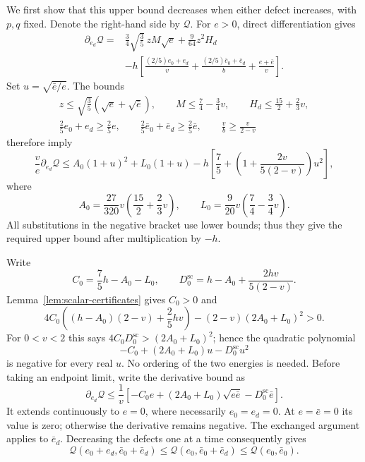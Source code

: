 We first show that this upper bound decreases when either defect
increases, with $p,q$ fixed. Denote the right-hand side by $\mathcal Q$.
For $e>0$, direct differentiation gives
\[
\begin{aligned}
 \partial_{e_d}\mathcal Q={}&
       \frac34\sqrt{\frac35}\,zM\sqrt e
       +\frac9{64}z^2H_d\\
 &-h\left[
       \frac{(2/5)e_0+e_d}{v}
       +\frac{(2/5)\bar e_0+\bar e_d}{b}
       +\frac{e+\bar e}{v}\right].
\end{aligned}
\]
Set $u=\sqrt{\bar e/e}$. The bounds
\[
\begin{gathered}
 z\le\sqrt{\frac35}(\sqrt e+\sqrt{\bar e}),\qquad
 M\le\frac74-\frac34v,\qquad H_d\le\frac{15}{2}+\frac23v,\\
 \frac25e_0+e_d\ge\frac25e,\qquad
 \frac25\bar e_0+\bar e_d\ge\frac25\bar e,
 \qquad \frac vb\ge\frac{v}{2-v}
\end{gathered}
\]
therefore imply
\[
 \frac ve\partial_{e_d}\mathcal Q
 \le A_0(1+u)^2+L_0(1+u)
       -h\left[\frac75+
          \left(1+\frac{2v}{5(2-v)}\right)u^2\right],
\]
where
\[
 A_0=\frac{27}{320}v\left(\frac{15}{2}+\frac23v\right),
 \qquad L_0=\frac9{20}v\left(\frac74-\frac34v\right).
\]
All substitutions in the negative bracket use lower bounds; thus they
give the required upper bound after multiplication by $-h$.

Write
\[
 C_0=\frac75h-A_0-L_0,\qquad
 D_0^{\mathrm{sc}}=h-A_0+\frac{2hv}{5(2-v)}.
\]
Lemma~\ref{lem:scalar-certificates} gives $C_0>0$ and
\[
 4C_0\left((h-A_0)(2-v)+\frac25hv\right)
       -(2-v)(2A_0+L_0)^2>0.
\]
For $0<v<2$ this says
$4C_0D_0^{\mathrm{sc}}>(2A_0+L_0)^2$; hence the quadratic polynomial
\[
 -C_0+(2A_0+L_0)u-D_0^{\mathrm{sc}}u^2
\]
is negative for every real $u$. No ordering of the two energies is
needed. Before taking an endpoint limit, write the derivative bound as
\[
 \partial_{e_d}\mathcal Q\le\frac1v
 \left[-C_0e+(2A_0+L_0)\sqrt{e\bar e}
                    -D_0^{\mathrm{sc}}\bar e\right].
\]
It extends continuously to $e=0$, where necessarily $e_0=e_d=0$.
At $e=\bar e=0$ its value is zero; otherwise the derivative remains
negative. The exchanged argument applies to $\bar e_d$. Decreasing
the defects one at a time consequently gives
\[
 \mathcal Q(e_0+e_d,\bar e_0+\bar e_d)
 \le\mathcal Q(e_0,\bar e_0+\bar e_d)
 \le\mathcal Q(e_0,\bar e_0).
\]

